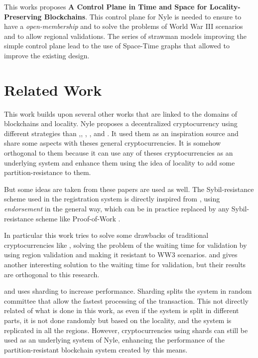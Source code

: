\documentclass[a4paper,11pt,oneside]{report}
\begin{document}
This works proposes \textbf{A Control Plane in Time and Space for
Locality-Preserving Blockchains}. This control plane for Nyle is needed to
ensure to have a \textit{open-membership} and to solve the problems of World
War III scenarios and to allow regional validations. The series of strawman
models improving the simple control plane lead to the use of Space-Time graphs
that allowed to improve the existing design. 



\chapter{Related Work} \label{chap:RelatedWork}
This work builds upon several other works that are linked to the domains of
blockchains and locality. Nyle proposes a decentralized cryptocurrency using
different strategies than \cite{bitcoin-paper},\cite{Byzcoin},
\cite{Omniledger}, \cite{Dfinity}, \cite{Monoxide} and \cite{Stellar}. It used
them as an inspiration source and share some aspects with theses general
cryptocurrencies.  It is somehow orthogonal to them because it can use any of
theses cryptocurrencies as an underlying system and enhance them using the idea
of locality to add some partition-resistance to them. 

But some ideas are taken from these papers are used as well.  The
Sybil-resistance scheme used in the registration system is directly inspired
from \cite{Dfinity}, using \textit{endorsement} in the general way, which can
be in practice replaced by any Sybil-resistance scheme like Proof-of-Work
\cite{bitcoin-paper}. 

In particular this work tries to solve some drawbacks of traditional
cryptocurrencies like \cite{bitcoin-paper}, solving the problem of the waiting
time for validation by using region validation and making it resistant to WW3
scenarios. \cite{Byzcoin} and \cite{Omniledger} gives another interesting
solution to the waiting time for validation, but their results are orthogonal
to this research.

\cite{Omniledger} and \cite{Monoxide} uses sharding to increase performance.
Sharding splits the system in random committee that allow the fastest
processing of the transaction. This not directly related of what is done in
this work, as even if the system is split in different parts, it is not done
randomly but based on the locality, and the system is replicated in all the
regions. However, cryptocurrencies using shards can still be used as an
underlying system of Nyle, enhancing the performance of the partition-resistant
blockchain system created by this means.
\end{document}
